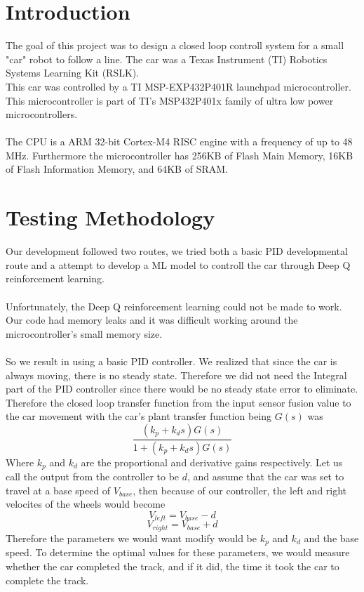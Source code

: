 \documentclass[12pt]{article}
\begin{document}
\begin{multicols}{2}
\section*{Introduction}
The goal of this project was to design a closed loop controll system for a small "car" robot to follow
a line. The car was a Texas Instrument (TI) Robotics Systems Learning Kit (RSLK).\\
This car was controlled by a TI MSP-EXP432P401R launchpad microcontroller. This microcontroller is part of TI's MSP432P401x family of 
ultra low power microcontrollers.\\\\ The CPU is a ARM 32-bit Cortex-M4 RISC engine with a frequency of up to 48 MHz. Furthermore the microcontroller
has 256KB of Flash Main Memory, 16KB of Flash Information Memory, and 64KB of SRAM.
\section*{Testing Methodology}
Our development followed two routes, we tried both a basic PID developmental route and a attempt to develop a ML model to controll
the car through Deep Q reinforcement learning.
\\\\
Unfortunately, the Deep Q reinforcement learning could not be made to work. Our code had memory leaks and 
it was difficult working around the microcontroller's small memory size.\\\\
So we result in using a basic PID controller. We realized that since the car is always moving, there is no steady state.
Therefore we did not need the Integral part of the PID controller since there would be no steady state error to eliminate.
Therefore the closed loop transfer function from the input sensor fusion value to the car movement with the car's plant transfer
function being $G(s)$ was
$$\frac{(k_p+k_d s)G(s)}{1+(k_p+k_d s)G(s)}$$
Where $k_p$ and $k_d$ are the proportional and derivative gains respectively. Let us call the output from the controller to be 
$d$, and assume that the car was set to travel at a base speed of
$V_{base}$, then because of our controller, the left and right velocites of the wheels would become
$$V_{left}=V_{base}-d$$
$$V_{right}=V_{base}+d$$
Therefore the parameters we would want modify would be $k_p$ and $k_d$ and the base speed. To determine
the optimal values for these parameters, we would measure whether the car completed the track, and if it did,
the time it took the car to complete the track.

\end{multicols}
\end{document}
